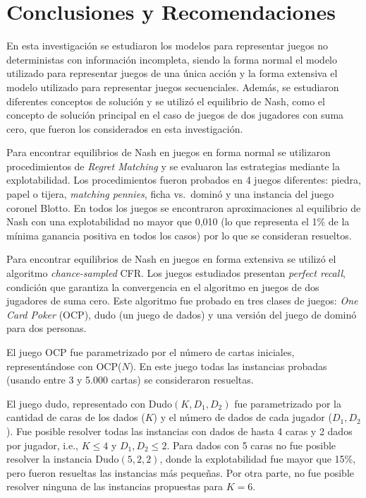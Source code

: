 \chapter*{Conclusiones y Recomendaciones}

En esta investigación se estudiaron los modelos para representar juegos no deterministas con información incompleta, siendo la forma normal el modelo utilizado para representar juegos de una única acción y la forma extensiva el modelo utilizado para representar juegos secuenciales. Además, se estudiaron diferentes conceptos de solución y se utilizó el equilibrio de Nash, como el concepto de solución principal en el caso de juegos de dos jugadores con suma cero, que fueron los considerados en esta investigación.

Para encontrar equilibrios de Nash en juegos en forma normal se utilizaron procedimientos de \textit{Regret Matching} y se evaluaron las estrategias mediante la explotabilidad. Los procedimientos fueron probados en 4 juegos diferentes: piedra, papel o tijera, \textit{matching pennies}, ficha vs.\ dominó y una instancia del juego coronel Blotto. En todos los juegos se encontraron aproximaciones al equilibrio de Nash con una explotabilidad no mayor que 0,010 (lo que representa el  1\% de la mínima ganancia positiva en todos los casos) por lo que se consideran resueltos.

Para encontrar equilibrios de Nash en juegos en forma extensiva se utilizó el algoritmo \textit{chance-sampled} CFR. Los juegos estudiados presentan \textit{perfect recall}, condición que garantiza la convergencia en el algoritmo en juegos de dos jugadores de suma cero. Este algoritmo fue probado en tres clases de juegos: \textit{One Card Poker} (OCP), dudo (un juego de dados) y una versión del juego de dominó para dos personas.

El juego OCP fue parametrizado por el número de cartas iniciales, representándose con OCP($N$). En este juego todas las instancias probadas (usando entre 3 y 5.000 cartas) se consideraron resueltas.

El juego dudo, representado con Dudo$(K, D_1, D_2)$ fue parametrizado por la cantidad de caras de los dados ($K$) y el número de dados de cada jugador ($D_1, D_2$). Fue posible resolver todas las instancias con dados de hasta 4 caras y 2 dados por jugador, i.e., $K \leq 4$ y $D_1, D_2 \leq 2$. Para dados con 5 caras no fue posible resolver la instancia Dudo$(5, 2, 2)$, donde la explotabilidad fue mayor que 15\%, pero fueron resueltas las instancias más pequeñas. Por otra parte, no fue posible resolver ninguna de las instancias propuestas para $K = 6$.


